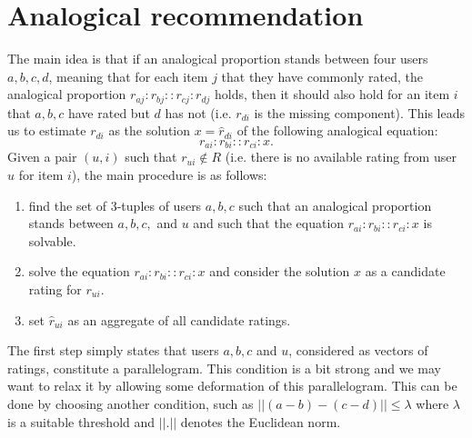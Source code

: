 \documentclass{llncs}
\begin{document}
\section{Analogical recommendation}\label{anareco}
The main idea is that if an analogical proportion stands between four
users $a, b, c, d$, meaning that for each item $j$ that they have commonly
rated, the analogical proportion $r_{aj} : r_{bj} :: r_{cj} : r_{dj}$ holds,
then it should also hold for an item $i$ that $a, b, c$ have rated but $d$ has
not (i.e. $r_{di}$ is the missing component). This leads us to estimate
$r_{di}$ as the solution $x = \hat{r}_{di}$ of the following analogical equation:
$$r_{ai} : r_{bi} :: r_{ci} : x.$$
\noindent
Given a pair $(u,i)$ such that $r_{ui} \notin R$ (i.e. there is no available 
rating from user $u$ for item $i$), the main procedure is as follows:
\begin{enumerate}
\item find the set of 3-tuples of users $a, b, c$ such that an analogical proportion
stands between $a, b, c,$ and $u$ and such that the equation $r_{ai} : r_{bi} :: r_{ci} : x$
is solvable.
\item solve the equation $r_{ai} : r_{bi} :: r_{ci} : x$ and consider the solution
$x$ as a candidate rating for $r_{ui}$.
\item set $\hat{r}_{ui}$ as an aggregate of all candidate ratings.
\end{enumerate}

The first step simply states that users $a, b, c$ and $u$, considered as
vectors of ratings, constitute a parallelogram.  This condition is a bit strong
and we may want to relax it by allowing some deformation of this parallelogram.
This can be done by choosing another condition, such as $||(a-b) - (c-d)|| \leq
\lambda$ where $\lambda$ is a suitable threshold and $||.||$ denotes the
Euclidean norm. 
\end{document}
